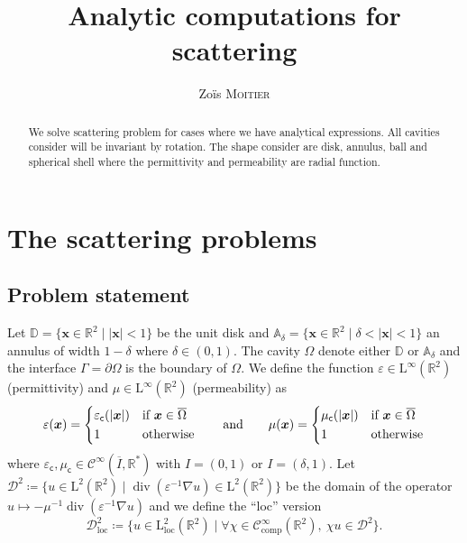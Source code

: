 \documentclass[12pt,a4paper]{article}
\title{Analytic computations for scattering}
\author{Zoïs \textsc{Moitier}}
\newcommand{\bbA}{\mathbb{A}}
\newcommand{\bbD}{\mathbb{D}}
\newcommand{\bbR}{\mathbb{R}}
\newcommand{\calD}{\mathcal{D}}
\newcommand{\scrC}{\mathscr{C}}
\newcommand{\rmL}{\mathrm{L}}
\DeclareMathOperator{\Div}{div}
\newcommand{\vx}{\boldsymbol{x}}
\newcommand{\eps}{\varepsilon}
\newcommand{\comp}{\mathrm{comp}}
\newcommand{\loc}{\mathrm{loc}}
\newcommand{\ecav}{\varepsilon_\mathsf{c}}
\newcommand{\mcav}{\mu_\mathsf{c}}
\begin{document}
\maketitle

\begin{abstract}
    We solve scattering problem for cases where we have analytical expressions.
    All cavities consider will be invariant by rotation.
    The shape consider are disk, annulus, ball and spherical shell where the permittivity and permeability are radial function.
\end{abstract}

\tableofcontents

\section{The scattering problems}

\subsection{Problem statement}

Let $\bbD = \{\vx \in \bbR^2 \mid |\vx| < 1\}$ be the unit disk and $\bbA_\delta = \{\vx \in \bbR^2 \mid \delta < |\vx| < 1\}$ an annulus of width $1-\delta$ where $\delta \in (0, 1)$.
The cavity $\Omega$ denote either $\bbD$ or $\bbA_\delta$ and the interface $\Gamma = \partial\Omega$ is the boundary of $\Omega$.
We define the function $\eps \in \rmL^\infty(\bbR^2)$ (permittivity) and $\mu \in \rmL^\infty(\bbR^2)$ (permeability) as
\[
    \eps(\vx) = \begin{dcases}
        \ecav(|\vx|) & \text{if } \vx \in \overline{\Omega}\\
        1 & \text{otherwise}
    \end{dcases} \qquad
    \text{and} \qquad
    \mu(\vx) = \begin{dcases}
        \mcav(|\vx|) & \text{if } \vx \in \overline{\Omega}\\
        1 & \text{otherwise}
    \end{dcases}
\]
where $\ecav, \mcav \in \scrC^\infty(\overline{I}, \bbR^*)$ with $I = (0,1)$ or $I = (\delta, 1)$.
Let $\calD^2 \coloneqq \{u \in \rmL^2(\bbR^2) \mid \Div(\eps^{-1} \nabla u) \in \rmL^2(\bbR^2)\}$ be the domain of the operator $u \mapsto -\mu^{-1}\Div(\eps^{-1} \nabla u)$ and we define the ``loc'' version
\[
    \calD_\loc^2 \coloneqq \{u \in \rmL_\loc^2(\bbR^2) \mid \forall \chi \in \scrC_\comp^\infty(\bbR^2),\ \chi u \in \calD^2\}.
\]
\end{document}
